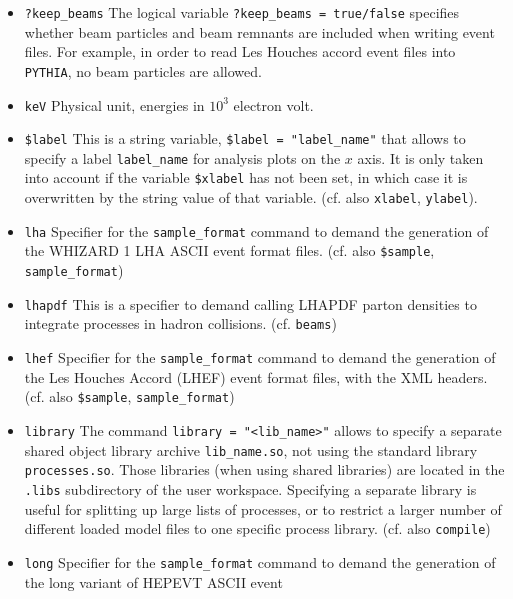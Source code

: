 \documentclass[12pt]{book}
\newcommand{\ttt}[1]{\texttt{#1}}
\newcommand{\pythia}{\texttt{PYTHIA}}
\begin{document}
\begin{itemize}
\item
 \ttt{?keep\_beams} \newline
 The logical variable \texttt{?keep\_beams = true/false} specifies whether
 beam particles and beam remnants are included when writing event files.
 For example, in order to read Les Houches accord event files into \pythia,
 no beam particles are allowed.
\item
 \ttt{keV} \newline
 Physical unit, energies in $10^3$ electron volt. 
\item
\ttt{\$label} \newline
This is a string variable, \ttt{\$label = "label\_name"} that allows
to specify a label \ttt{label\_name} for analysis plots on the $x$
axis. It is only taken into account if the variable \ttt{\$xlabel} has
not been set, in which case it is overwritten by the string value of
that variable. (cf. also \ttt{xlabel}, \ttt{ylabel}).
\item
\ttt{lha} \newline 
Specifier for the \ttt{sample\_format} command to demand the
generation of the WHIZARD 1 LHA ASCII event format
files. (cf. also \ttt{\$sample}, 
\ttt{sample\_format}) 
\item
\ttt{lhapdf} \newline
This is a specifier to demand calling LHAPDF parton densities to
integrate processes in hadron collisions.
(cf. \ttt{beams})
\item
\ttt{lhef} \newline 
Specifier for the \ttt{sample\_format} command to demand the
generation of the Les Houches Accord (LHEF) event format files, with
the XML headers. (cf. also \ttt{\$sample}, 
\ttt{sample\_format}) 
\item
\ttt{library} \newline
The command \ttt{library = "<lib\_name>"} allows to specify a separate
shared object library archive \ttt{lib\_name.so}, not using the
standard library \ttt{processes.so}. Those libraries (when using
shared libraries) are located in the \ttt{.libs} subdirectory of the
user workspace. Specifying a separate library is useful for splitting
up large lists of processes, or to restrict a larger number of
different loaded model files to one specific process library.
(cf. also \ttt{compile})
\item
\ttt{long} \newline 
Specifier for the \ttt{sample\_format} command to demand the
generation of the long variant of HEPEVT ASCII event

\end{itemize}
\end{document}
